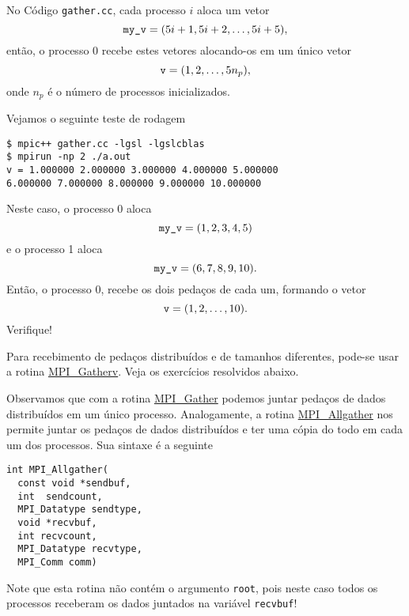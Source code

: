 \begin{ex}
  No Código \verb+gather.cc+, cada processo $i$ aloca um vetor
  \begin{equation}
    \verb+my_v+ = (5i+1, 5i+2, \dotsc, 5i+5),
  \end{equation}
  então, o processo 0 recebe estes vetores alocando-os em um único vetor
  \begin{equation}
    \verb+v+ = (1, 2, \dotsc, 5n_p),
  \end{equation}
  onde $n_p$ é o número de processos inicializados.

  
  
  Vejamos o seguinte teste de rodagem
\begin{verbatim}
$ mpic++ gather.cc -lgsl -lgslcblas
$ mpirun -np 2 ./a.out                                             
v = 1.000000 2.000000 3.000000 4.000000 5.000000 
6.000000 7.000000 8.000000 9.000000 10.000000
\end{verbatim}
  Neste caso, o processo  0 aloca
  \begin{equation}
    \verb+my_v+ = (1, 2, 3, 4, 5)
  \end{equation}
  e o processo 1 aloca
  \begin{equation}
    \verb+my_v+ = (6, 7, 8, 9, 10).
  \end{equation}
  Então, o processo 0, recebe os dois pedaços de cada um, formando o vetor
  \begin{equation}
    \verb+v+ = (1, 2, \dotsc, 10).
  \end{equation}
  Verifique!
\end{ex}

\begin{obs}
  Para recebimento de pedaços distribuídos e de tamanhos diferentes, pode-se usar a rotina \href{https://www.open-mpi.org/doc/current/man3/MPI\_Gatherv.3.php}{MPI\_Gatherv}. Veja os exercícios resolvidos abaixo.
\end{obs}

\begin{obs}
  Observamos que com a rotina \href{https://www.open-mpi.org/doc/current/man3/MPI\_Gather.3.php}{MPI\_Gather} podemos juntar pedaços de dados distribuídos em um único processo. Analogamente, a rotina \href{https://www.open-mpi.org/doc/current/man3/MPI\_Allgather.3.php}{MPI\_Allgather} nos permite juntar os pedaços de dados distribuídos e ter uma cópia do todo em cada um dos processos. Sua sintaxe é a seguinte
\begin{verbatim}
int MPI_Allgather(
  const void *sendbuf, 
  int  sendcount,
  MPI_Datatype sendtype, 
  void *recvbuf, 
  int recvcount,
  MPI_Datatype recvtype, 
  MPI_Comm comm)
\end{verbatim}
  Note que esta rotina não contém o argumento \verb+root+, pois neste caso todos os processos receberam os dados juntados na variável \verb+recvbuf+!
\end{obs}

